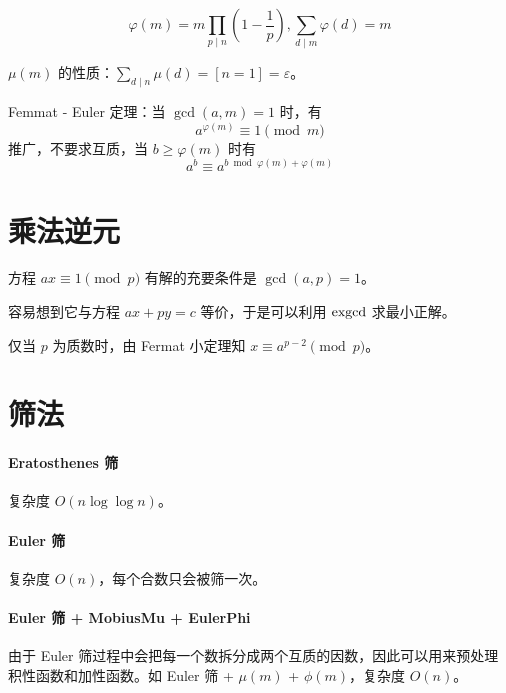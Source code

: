 \documentclass{probook}
\begin{document}
\begin{multicols}{2}
\[ \varphi(m) = m \prod_{p \mid n}\left( 1-\frac{1}{p} \right), \sum_{d \mid m} \varphi(d) = m \]

$\mu(m)$ 的性质：$\sum\limits_{d \mid n} \mu(d) = [n=1] = \varepsilon$。

Femmat - Euler 定理：当 $\gcd(a,m) = 1$ 时，有
\[ a^{\varphi(m)} \equiv 1 \pmod m \]
推广，不要求互质，当 $b \geqslant \varphi(m)$ 时有
\[ a^b \equiv a^{b \bmod \varphi(m) + \varphi(m) } \]

\section{乘法逆元}

方程 $ax \equiv 1 \pmod p$ 有解的充要条件是 $\gcd(a,p) = 1$。

容易想到它与方程 $ax + py = c$ 等价，于是可以利用 $\rm exgcd$ 求最小正解。



仅当 $p$ 为质数时，由 Fermat 小定理知 $x \equiv a^{p-2} \pmod p$。



\section{筛法}

\paragraph{Eratosthenes 筛}

复杂度 $O(n\log \log n)$。



\paragraph{Euler 筛}

复杂度 $O(n)$，每个合数只会被筛一次。



\paragraph{Euler 筛 + MobiusMu + EulerPhi}

由于 Euler 筛过程中会把每一个数拆分成两个互质的因数，因此可以用来预处理积性函数和加性函数。如 Euler 筛 + $\mu(m)$ + $\phi(m)$，复杂度 $O(n)$。


\end{multicols}
\end{document}
